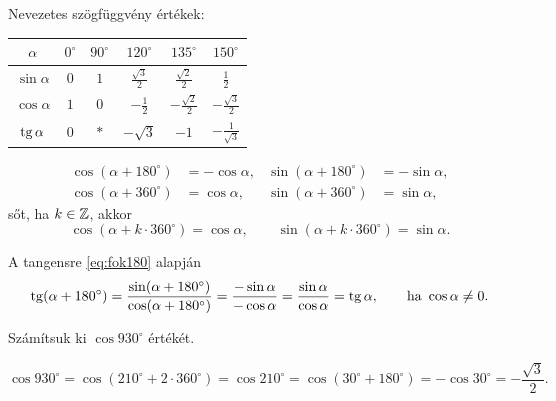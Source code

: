 \documentclass[11pt]{article}
\begin{document}
\noindent Nevezetes szögfüggvény értékek:
\begin{center}
\renewcommand{\arraystretch}{1.7}
\begin{tabular}{c|ccccc}
\hline
$\alpha$ & $0^{\circ}$ & $90^{\circ}$ & $120^{\circ}$ & $135^{\circ}$ & $150^{\circ}$\\
\hline
$\sin\alpha$ & $0$ & $1$ & $\frac{\sqrt{3}}{2}$ & $\frac{\sqrt{2}}{2}$ & $\frac{1}{2}$\\
$\cos\alpha$ & $1$ & $0$ & $-\frac{1}{2}$ & $-\frac{\sqrt{2}}{2}$ & $-\frac{\sqrt{3}}{2}$\\
$\operatorname{tg}\alpha$ & $0$ & $\ast$ & $-\sqrt{3}$ & $-1$ & $-\frac{1}{\sqrt{3}}$\\
\hline
\end{tabular}
\end{center}

\begin{thmbox}
\begin{theorem}[Tulajdonságok]
\begin{align}
\cos(\alpha+180^{\circ})&=-\cos\alpha, &
\sin(\alpha+180^{\circ})&=-\sin\alpha, \label{eq:fok180}\\
\cos(\alpha+360^{\circ})&=\cos\alpha, &
\sin(\alpha+360^{\circ})&=\sin\alpha, \label{eq:fok360}
\end{align}
sőt, ha $k\in\mathbb{Z}$, akkor
\begin{equation}\label{eq:fokk360}
\cos(\alpha+k\cdot 360^{\circ})=\cos\alpha,\qquad
\sin(\alpha+k\cdot 360^{\circ})=\sin\alpha .
\end{equation}
\end{theorem}
\end{thmbox}

A tangensre \eqref{eq:fok180} alapján
\[
\operatorname{tg}(\alpha+180^{\circ})=\frac{\sin(\alpha+180^{\circ})}{\cos(\alpha+180^{\circ})}
=\frac{-\sin\alpha}{-\cos\alpha}=\frac{\sin\alpha}{\cos\alpha}=\operatorname{tg}\alpha,
\qquad \text{ha } \cos\alpha\neq 0 .
\]

\begin{exbox}
\begin{example}
Számítsuk ki $\cos 930^{\circ}$ értékét.
\end{example}
\end{exbox}
\begin{solution}
\[
\cos 930^{\circ}=\cos(210^{\circ}+2\cdot 360^{\circ})=\cos 210^{\circ}
=\cos(30^{\circ}+180^{\circ})=-\cos 30^{\circ}=-\frac{\sqrt{3}}{2}.
\]
\end{solution}
\end{document}
